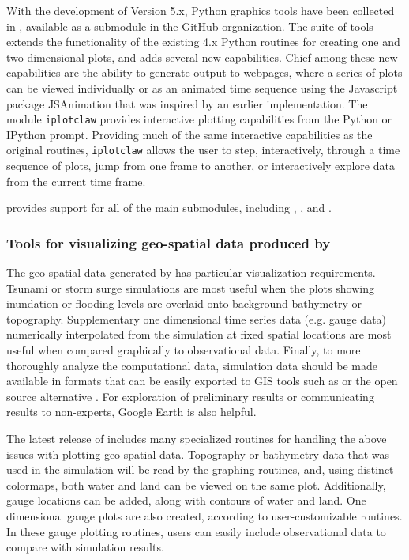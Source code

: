 With the development of \cpack Version 5.x, Python graphics tools
have been collected in \vclaw, available as a submodule in the
\cpack GitHub organization.  The \vclaw suite of tools extends the
functionality of the existing 4.x Python routines for creating one and
two dimensional plots, and adds several new capabilities.  Chief among
these new capabilities are the ability to generate output to webpages,
where a series of plots can be viewed individually or as an animated
time sequence using the Javascript package {\sc JSAnimation}
\cite{jsanimation} that was inspired by an earlier \clawpack implementation.  
The \vclaw module {\tt iplotclaw} provides
interactive plotting capabilities from the Python or IPython prompt.
Providing much of the same interactive capabilities as the original
\mlab routines, {\tt iplotclaw} allows the user to step,
interactively, through a time sequence of plots, jump from one frame
to another, or interactively explore data from the current time frame.

\vclaw provides support for all of the main \cpack submodules, including
\cclaw, \aclaw, \pclaw and \gclaw.

\subsubsection{Tools for visualizing geo-spatial data produced by \gclaw}
The geo-spatial data generated by \gclaw has particular visualization
requirements.  Tsunami or storm surge simulations are most useful when
the plots showing inundation or flooding levels are overlaid onto
background bathymetry or topography.  Supplementary one dimensional
time series data (e.g. gauge data) numerically interpolated from
the simulation at fixed spatial locations are most useful when
compared graphically to observational data.  Finally, to more
thoroughly analyze the computational data, simulation data
should be made available in formats that can be easily exported to GIS tools
such as \agis or the open source alternative \qgis
\cite{arcgis,qgis}.  For exploration of preliminary results or 
communicating results to non-experts, Google
Earth is also helpful.

The latest release of \cpack includes many specialized \vclaw routines
for handling the above issues with plotting geo-spatial data.
Topography or bathymetry data that was
used in the simulation will be read by the graphing routines, and,
using distinct colormaps, both water and land can be viewed on the
same plot.   Additionally, gauge locations can be added, along with contours
of water and land.  One dimensional gauge plots are also created, according to
user-customizable routines. In these gauge plotting routines,
users can easily include  observational data to compare with \gclaw
simulation results.

